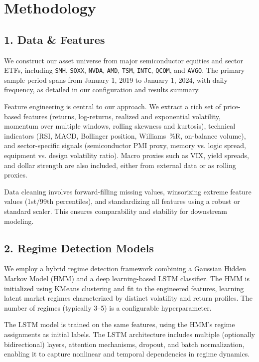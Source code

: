 \section{Methodology}

\subsection{1. Data \& Features}
We construct our asset universe from major semiconductor equities and sector ETFs, including \texttt{SMH}, \texttt{SOXX}, \texttt{NVDA}, \texttt{AMD}, \texttt{TSM}, \texttt{INTC}, \texttt{QCOM}, and \texttt{AVGO}. The primary sample period spans from January 1, 2019 to January 1, 2024, with daily frequency, as detailed in our configuration and results summary.

Feature engineering is central to our approach. We extract a rich set of price-based features (returns, log-returns, realized and exponential volatility, momentum over multiple windows, rolling skewness and kurtosis), technical indicators (RSI, MACD, Bollinger position, Williams~\%R, on-balance volume), and sector-specific signals (semiconductor PMI proxy, memory vs. logic spread, equipment vs. design volatility ratio). Macro proxies such as VIX, yield spreads, and dollar strength are also included, either from external data or as rolling proxies.

Data cleaning involves forward-filling missing values, winsorizing extreme feature values (1st/99th percentiles), and standardizing all features using a robust or standard scaler. This ensures comparability and stability for downstream modeling.

\subsection{2. Regime Detection Models}
We employ a hybrid regime detection framework combining a Gaussian Hidden Markov Model (HMM) and a deep learning-based LSTM classifier. The HMM is initialized using KMeans clustering and fit to the engineered features, learning latent market regimes characterized by distinct volatility and return profiles. The number of regimes (typically 3--5) is a configurable hyperparameter.

The LSTM model is trained on the same features, using the HMM's regime assignments as initial labels. The LSTM architecture includes multiple (optionally bidirectional) layers, attention mechanisms, dropout, and batch normalization, enabling it to capture nonlinear and temporal dependencies in regime dynamics.

